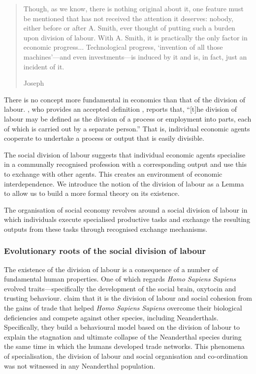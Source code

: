 \begin{quote}
Though, as we know, there is nothing original about it, one feature must be mentioned that has not received the attention it deserves: nobody, either before or after A. Smith, ever thought of putting such a burden upon division of labour. With A. Smith, it is practically the only factor in economic progress... Technological progress, `invention of all those machines'---and even investments---is induced by it and is, in fact, just an incident of it.

\begin{flushright}
Joseph \citet[p.~182]{Schumpeter1954}
\end{flushright}
\end{quote}

There is no concept more fundamental in economics than that of the division of labour. \citet[p.~901]{Groenewegen1987}, who provides an accepted definition \citep[p.~4]{Sun2005}, reports that, ``[t]he division of labour may be defined as the division of a process or employment into parts, each of which is carried out by a separate person.'' That is, individual economic agents cooperate to undertake a process or output that is easily divisible.

The social division of labour suggests that individual economic agents specialise in a communally recognised profession with a corresponding output and use this to exchange with other agents. This creates an environment of economic interdependence. We introduce the notion of the division of labour as a Lemma to allow us to build a more formal theory on its existence.

\begin{lemma} \label{SDoL}
The organisation of social economy revolves around a social division of labour in which individuals execute specialised productive tasks and exchange the resulting outputs from these tasks through recognised exchange mechanisms.
\end{lemma}

\subsubsection{Evolutionary roots of the social division of labour}

The existence of the division of labour is a consequence of a number of fundamental human properties. One of which regards \emph{Homo Sapiens Sapiens} evolved traits---specifically the development of the social brain, oxytocin and trusting behaviour. \citet{Horan2005} claim that it is the division of labour and social cohesion from the gains of trade that helped \emph{Homo Sapiens Sapiens} overcome their biological deficiencies and compete against other species, including Neanderthals. Specifically, they build a behavioural model based on the division of labour to explain the stagnation and ultimate collapse of the Neanderthal species during the same time in which the humans developed trade networks. This phenomena of specialisation, the division of labour and social organisation and co-ordination was not witnessed in any Neanderthal population.

